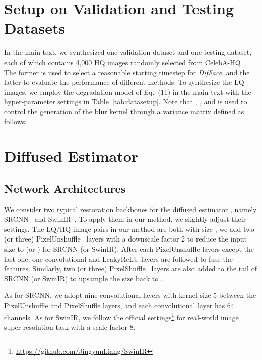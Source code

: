 \documentclass[10pt,twocolumn,letterpaper]{article}
\begin{document}
{\small


}

\clearpage
\appendix
\section{Setup on Validation and Testing Datasets}\label{sec:evalation_setup_supp}
In the main text, we synthesized one validation dataset and one testing dataset, each of which contains 4,000 HQ images randomly selected from CelebA-HQ~\cite{karras2018progressive}. The former is used to select a reasonable starting timestep  for \textit{DifFace}, and the latter to evaluate the performance of different methods. To synthesize the LQ images, we employ the degradation model of Eq.~(11) in the main text with the hyper-parameter settings in Table~\ref{tab:datasetup}. Note that , , and  is used to control the generation of the blur kernel  through a variance matrix defined as follows:


\section{Diffused Estimator}\label{sec:backbone_supp}
\subsection{Network Architectures}
We consider two typical restoration backbones for the diffused estimator , namely SRCNN~\cite{dong2015image} and SwinIR~\cite{liang2021swinir}. To apply them in our method, we slightly adjust their settings. The LQ/HQ image pairs in our method are both with size , we add two (or three) PixelUnshuffle~\cite{shi2016real} layers with a downscale factor 2 to reduce the input size to  (or ) for SRCNN (or SwinIR). After each PixelUnshuffle layers except the last one, one convolutional and LeakyReLU layers are followed to fuse the features. Similarly, two (or three) PixelShuffle~\cite{shi2016real} layers are also added to the tail of SRCNN (or SwinIR) to upsample the size back to .

As for SRCNN, we adopt nine convolutional layers with kernel size 5 between the PixelUnshuffle and PixelShuffle layers, and each convolutional layer has 64 channels. As for SwinIR, we follow the official settings\footnote{\url{https://github.com/JingyunLiang/SwinIR}} for real-world image super-resolution task with a scale factor 8.
\end{document}
